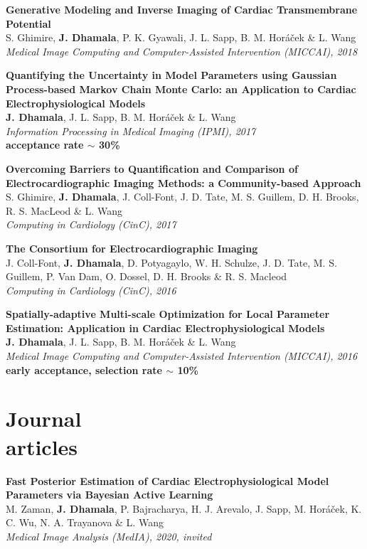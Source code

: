 \documentclass[margin]{res}
\begin{document}
\begin{resume}
\textbf{Generative Modeling and Inverse Imaging of Cardiac Transmembrane Potential}\\
\small{S. Ghimire, \textbf{J. Dhamala}, P. K. Gyawali, J. L. Sapp, B. M. Hor\'{a}\v{c}ek \& L. Wang} \\
{\sl Medical Image Computing and Computer-Assisted Intervention (MICCAI), 2018}

\textbf{Quantifying the Uncertainty in Model Parameters using Gaussian Process-based Markov Chain Monte Carlo: an Application to Cardiac Electrophysiological Models}\\
\small{\textbf{J. Dhamala}, J. L. Sapp, B. M. Hor\'{a}\v{c}ek \& L. Wang}\\
{\sl Information Processing in Medical Imaging (IPMI), 2017}\\
\textbf{acceptance rate $\sim$ 30\%}

\textbf{Overcoming Barriers to Quantification and Comparison of Electrocardiographic Imaging Methods: a Community-based Approach}\\
\small{S. Ghimire, \textbf{J. Dhamala}, J. Coll-Font, J. D. Tate, M. S. Guillem, D. H. Brooks, R. S. MacLeod \& L. Wang}\\
{\sl Computing in Cardiology (CinC), 2017}


\textbf{The Consortium for Electrocardiographic Imaging}\\
\small{{J. Coll-Font, \textbf{J. Dhamala}, D. Potyagaylo, W. H. Schulze, J. D. Tate, M. S. Guillem, P. Van Dam, O. Dossel, D. H. Brooks \& R. S. Macleod}}\\
{\sl Computing in Cardiology (CinC), 2016}

\textbf{Spatially-adaptive Multi-scale Optimization for Local Parameter Estimation: Application in Cardiac Electrophysiological Models}\\
\small{\textbf{J. Dhamala}, J. L. Sapp, B. M. Hor\'{a}\v{c}ek \& L. Wang}\\
{\sl Medical Image Computing and Computer-Assisted Intervention (MICCAI), 2016}\\
\textbf{early acceptance, selection rate $\sim$ 10\%}

\section{Journal\\articles}
\textbf{Fast Posterior Estimation of Cardiac Electrophysiological Model Parameters via Bayesian Active Learning}\\
\small{ M. Zaman, \textbf{J. Dhamala}, P. Bajracharya, H. J. Arevalo, J. Sapp, M. Hor\'{a}\v{c}ek, K. C. Wu, N. A. Trayanova \& L. Wang}\\
{\sl Medical Image Analysis (MedIA), 2020, invited}


\end{resume}
\end{document}
